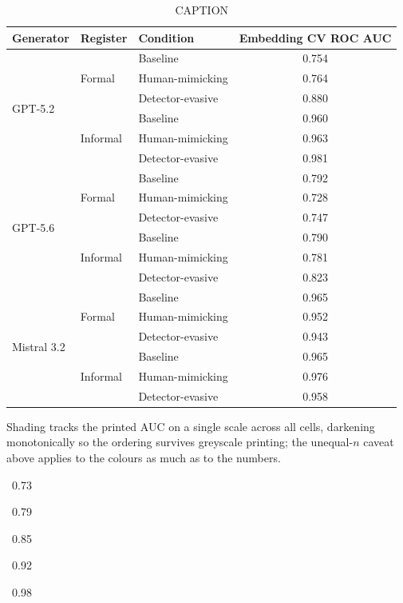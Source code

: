 \begin{table}[t]
  \centering
  \small
  \caption{CAPTION}
  \label{tab:embedding-auc}
  \begin{tabular}{lllc}
    \toprule
    Generator & Register & Condition & Embedding CV ROC AUC \\
    \midrule
    \multirow{6}{*}{GPT-5.2}
      & \multirow{3}{*}{Formal}
        & Baseline         & \cellcolor[HTML]{F6C0AD} 0.754 \\
      & & Human-mimicking  & \cellcolor[HTML]{F3BDA4} 0.764 \\
      & & Detector-evasive & \cellcolor[HTML]{A99F49} 0.880 \\
    \cmidrule(l){2-4}
      & \multirow{3}{*}{Informal}
        & Baseline         & \cellcolor[HTML]{4B9143} 0.960 \\
      & & Human-mimicking  & \cellcolor[HTML]{459044} 0.963 \\
      & & Detector-evasive & \cellcolor[HTML]{198C4A} 0.981 \\
    \midrule
    \multirow{6}{*}{GPT-5.6}
      & \multirow{3}{*}{Formal}
        & Baseline         & \cellcolor[HTML]{E6B38B} 0.792 \\
      & & Human-mimicking  & \cellcolor[HTML]{FFCBC3} 0.728 \\
      & & Detector-evasive & \cellcolor[HTML]{F9C3B3} 0.747 \\
    \cmidrule(l){2-4}
      & \multirow{3}{*}{Informal}
        & Baseline         & \cellcolor[HTML]{E7B48D} 0.790 \\
      & & Human-mimicking  & \cellcolor[HTML]{ECB795} 0.781 \\
      & & Detector-evasive & \cellcolor[HTML]{D5AA70} 0.823 \\
    \midrule
    \multirow{6}{*}{Mistral 3.2}
      & \multirow{3}{*}{Formal}
        & Baseline         & \cellcolor[HTML]{429044} 0.965 \\
      & & Human-mimicking  & \cellcolor[HTML]{579240} 0.952 \\
      & & Detector-evasive & \cellcolor[HTML]{64943E} 0.943 \\
    \cmidrule(l){2-4}
      & \multirow{3}{*}{Informal}
        & Baseline         & \cellcolor[HTML]{429044} 0.965 \\
      & & Human-mimicking  & \cellcolor[HTML]{2A8D48} 0.976 \\
      & & Detector-evasive & \cellcolor[HTML]{4E9142} 0.958 \\
    \bottomrule
  \end{tabular}

  \vspace{2pt}
  {\footnotesize Shading tracks the printed AUC on a single scale across all cells, darkening monotonically so the ordering survives greyscale printing; the unequal-$n$ caveat above applies to the colours as much as to the numbers. \colorbox[HTML]{FFCBC3}{\strut~0.73~} \colorbox[HTML]{E7B38C}{\strut~0.79~} \colorbox[HTML]{BEA358}{\strut~0.85~} \colorbox[HTML]{83983D}{\strut~0.92~} \colorbox[HTML]{198C4A}{\strut~0.98~}}
\end{table}
